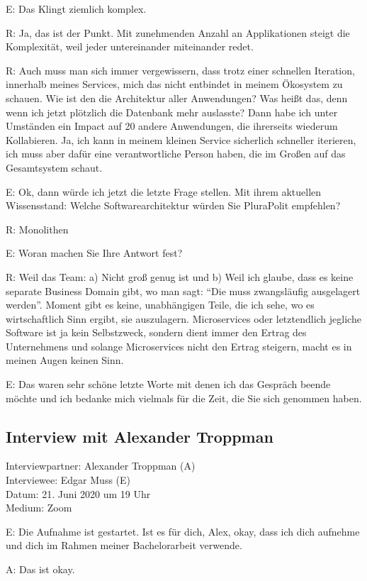 E: Das Klingt ziemlich komplex.

R: Ja, das ist der Punkt. Mit zunehmenden Anzahl an Applikationen steigt die Komplexität, weil jeder untereinander miteinander redet.

R: Auch muss man sich immer vergewissern, dass trotz einer schnellen Iteration, innerhalb meines Services, mich das nicht entbindet in meinem Ökosystem zu schauen. Wie ist den die Architektur aller Anwendungen? Was heißt das, denn wenn ich jetzt plötzlich die Datenbank  mehr auslasste? Dann habe ich unter Umständen ein Impact auf 20 andere Anwendungen, die ihrerseits wiederum Kollabieren. Ja, ich kann in meinem kleinen Service sicherlich schneller iterieren, ich muss aber dafür eine verantwortliche Person haben, die im Großen auf das Gesamtsystem schaut.

E: Ok, dann würde ich jetzt die letzte Frage stellen. 
Mit ihrem aktuellen Wissensstand: Welche Softwarearchitektur würden Sie PluraPolit empfehlen?

R: Monolithen

E: Woran machen Sie Ihre Antwort fest?

R: Weil das Team: a) Nicht groß genug ist und b) Weil ich glaube, dass es keine separate Business Domain gibt, wo man sagt: “Die muss zwangsläufig ausgelagert werden”.
Moment gibt es keine, unabhängigen Teile, die ich sehe, wo es wirtschaftlich Sinn ergibt, sie auszulagern. Microservices oder letztendlich jegliche Software ist ja kein Selbstzweck, sondern dient immer den Ertrag des Unternehmens und solange Microservices nicht den Ertrag steigern, macht es in meinen Augen keinen Sinn.

E: Das waren sehr schöne letzte Worte mit denen ich das Gespräch beende möchte und ich bedanke mich vielmals für die Zeit, die Sie sich genommen haben.

\subsection{Interview mit Alexander Troppman}
Interviewpartner: Alexander Troppman (A) \\
Interviewee: Edgar Muss (E) \\
Datum: 21. Juni 2020 um 19 Uhr \\
Medium: Zoom

E: Die Aufnahme ist gestartet. Ist es für dich, Alex, okay, dass ich dich aufnehme und dich im Rahmen meiner Bachelorarbeit verwende.

A: Das ist okay.

